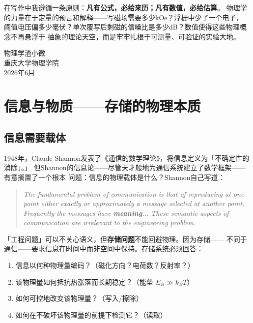 \documentclass[11pt,a4paper,openany]{book}
\theoremstyle{definition}
\theoremstyle{plain}
\theoremstyle{remark}
\begin{document}
在写作中我遵循一条原则：\textbf{凡有公式，必给来历；凡有数值，必给估算}。
物理学的力量在于定量的预言和解释——写磁场需要多少kOe？浮栅中少了一个电子，
阈值电压偏多少毫伏？单次覆写后剩磁的信噪比是多少dB？数值使得这些物理概念不再悬浮于
抽象的理论天空，而是牢牢扎根于可测量、可验证的实验大地。

\vspace{1cm}
\begin{flushright}
物理学渣小微\\
重庆大学物理学院\\
2026年6月
\end{flushright}

\newpage

\tableofcontents

\chapter{信息与物质——存储的物理本质}
\label{ch:information}

\section{信息需要载体}

1948年，Claude Shannon发表了《通信的数学理论》，将信息定义为「不确定性的消除」。」
但Shannon的信息论——尽管天才般地为通信系统建立了数学框架——有意搁置了一个根本
问题：信息的物理载体是什么？Shannon自己写道：

\begin{quote}\itshape
The fundamental problem of communication is that of reproducing at one point
either exactly or approximately a message selected at another point.
Frequently the messages have \textbf{meaning}... These semantic aspects of
communication are irrelevant to the engineering problem.
\end{quote}

「工程问题」可以不关心语义，但\textbf{存储问题}不能回避物理。因为存储——
不同于通信——要求信息在时间中而非空间中保持。存储系统必须回答：
\begin{enumerate}
  \item 信息以何种物理量编码？\quad（磁化方向？电荷数？反射率？）
  \item 该物理量如何抵抗热涨落而长期稳定？\quad（能垒 $E_B \gg k_B T$）
  \item 如何可控地改变该物理量？\quad（写入/擦除）
  \item 如何在不破坏该物理量的前提下检测它？\quad（读取）
\end{enumerate}
\end{document}

